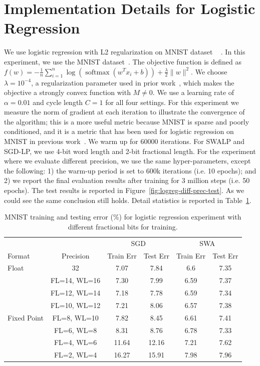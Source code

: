 \section{Implementation Details for Logistic Regression}\label{sec:logreg}

We use logistic regression with L2 regularization on MNIST dataset ~\cite{MNIST} .
In this experiment, we use the MNIST dataset~\cite{MNIST}. 
The objective function is defined as
$
    f(w) = - \frac{1}{n}\sum_{i=1}^n \log{(\operatorname{softmax}(w^Tx_i + b))} + \frac{\lambda}{2} \|w\|^2
$.
We choose $\lambda=10^{-4}$, a regularization parameter used in prior work~\cite{HALP,SVRG}, which makes the objective a strongly convex function with $M\ne 0$.
We use a learning rate of $\alpha = 0.01$ and cycle length $C=1$ for all four settings.
For this experiment we measure the norm of gradient at each iteration to illustrate the convergence of the algorithm; this is a more useful metric because MNIST is sparse and poorly conditioned, and it is a metric that has been used for logistic regression on MNIST in previous work~\cite{HALP}.
We warm up for 60000 iterations. 
For SWALP and SGD-LP, we use 4-bit word length and 2-bit fractional length.
For the experiment where we evaluate different precision, we use the same hyper-parameters, except the following: 1) the warm-up period is set to 600k iterations (i.e. 10 epochs); and 2) we report the final evaluation results after training for 3 million steps (i.e. 50 epochs). The test results is reported in Figure~\ref{fig:logreg-diff-prec-test}. As we could see the same conclusion still holds. Detail statistics is reported in Table~\ref{table:logreg-diffprec-stats}.

\begin{table}[H]
\centering
\caption{MNIST training and testing error (\%) for logistic regression experiment with different fractional bits for training.} 
\begin{tabular}{lccccc}

\toprule
 & & \multicolumn{2}{c}{SGD} & \multicolumn{2}{c}{SWA} \\
Format & Precision & Train Err   & Test Err  & Train Err   & Test Err  \\
\midrule
Float & 32 & 7.07 & 7.84 & 6.6 & 7.35 \\
\multirow{7}{*}{Fixed Point} & FL=14, WL=16 & 7.30 & 7.99 & 6.59 & 7.37 \\
 & FL=12, WL=14 & 7.18 & 7.78 & 6.59 & 7.34 \\
 & FL=10, WL=12 & 7.21 & 8.06 & 6.57 & 7.38 \\
 & FL=8, WL=10 & 7.82 & 8.45 & 6.61 & 7.41 \\
 & FL=6, WL=8 & 8.31 & 8.76 & 6.78 & 7.33 \\
 & FL=4, WL=6 & 11.64 & 12.16 & 7.21 & 7.62 \\
 & FL=2, WL=4 & 16.27 & 15.91 & 7.98 & 7.96 \\
\bottomrule
\end{tabular}
\label{table:logreg-diffprec-stats}
\end{table}


